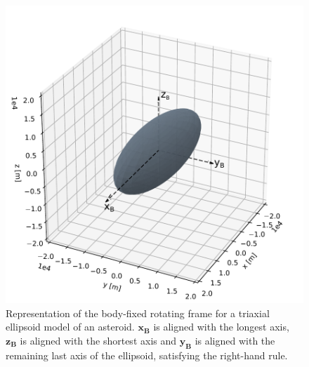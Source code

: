 \begin{figure}[htb]
\centering
\captionsetup{justification=centering}
\includegraphics[width=\textwidth, height=0.35\textheight, keepaspectratio=true]{body_fixed_ellipsoid_frame.pdf}
\caption{Representation of the body-fixed rotating frame for a triaxial ellipsoid model of an asteroid. $\bm{x_{B}}$ is aligned with the longest axis, $\bm{z_{B}}$ is aligned with the shortest axis and $\bm{y_{B}}$ is aligned with the remaining last axis of the ellipsoid, satisfying the right-hand rule.}
\label{fig:ellipsoid_rotating_frame}
\end{figure}
\FloatBarrier
